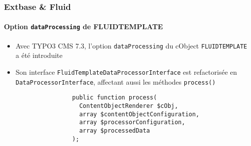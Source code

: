 \begin{frame}[fragile]
	\frametitle{Extbase \& Fluid}
	\framesubtitle{Option \texttt{dataProcessing} de FLUIDTEMPLATE}

	\lstset{basicstyle=\tiny\ttfamily}

	\begin{itemize}

		\item Avec TYPO3 CMS 7.3, l'option \texttt{dataProcessing} du cObject \texttt{FLUIDTEMPLATE} a été introduite

		\item Son interface \texttt{FluidTemplateDataProcessorInterface} est refactorisée en \texttt{DataProcessorInterface},
			affectant aussi les méthodes \texttt{process()}

			\begin{lstlisting}
				public function process(
				  ContentObjectRenderer $cObj,
				  array $contentObjectConfiguration,
				  array $processorConfiguration,
				  array $processedData
				);
			\end{lstlisting}

	\end{itemize}

	\breakingchange

\end{frame}

